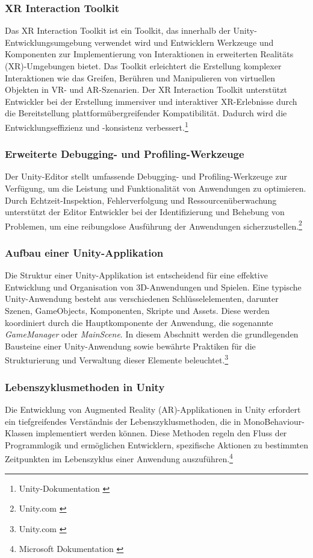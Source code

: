 \subsubsection*{XR Interaction Toolkit}
Das XR Interaction Toolkit ist ein Toolkit, das innerhalb der Unity-Entwicklungsumgebung verwendet wird und Entwicklern
Werkzeuge und Komponenten zur Implementierung von Interaktionen in erweiterten Realitäts (XR)-Umgebungen bietet. Das
Toolkit erleichtert die Erstellung komplexer Interaktionen wie das Greifen, Berühren und Manipulieren von virtuellen
Objekten in VR- und AR-Szenarien. Der XR Interaction Toolkit unterstützt Entwickler bei der Erstellung immersiver und
interaktiver XR-Erlebnisse durch die Bereitstellung plattformübergreifender Kompatibilität. Dadurch wird die Entwicklungseffizienz
und -konsistenz verbessert.\footnote{Unity-Dokumentation \cite{XR Interaction Toolkit}}

\subsubsection{Erweiterte Debugging- und Profiling-Werkzeuge}
Der Unity-Editor stellt umfassende Debugging- und Profiling-Werkzeuge zur Verfügung, um die Leistung und Funktionalität
von Anwendungen zu optimieren. Durch Echtzeit-Inspektion, Fehlerverfolgung und Ressourcenüberwachung unterstützt der
Editor Entwickler bei der Identifizierung und Behebung von Problemen, um eine reibungslose Ausführung der Anwendungen
sicherzustellen.\footnote{Unity.com \cite{Tools for profiling and debugging}}

\subsubsection{Aufbau einer Unity-Applikation}
Die Struktur einer Unity-Applikation ist entscheidend für eine effektive Entwicklung und Organisation von 3D-Anwendungen
und Spielen. Eine typische Unity-Anwendung besteht aus verschiedenen Schlüsselelementen, darunter Szenen, GameObjects,
Komponenten, Skripte und Assets. Diese werden koordiniert durch die Hauptkomponente der Anwendung, die sogenannte
\textit{GameManager} oder \textit{MainScene}. In diesem Abschnitt werden die grundlegenden Bausteine einer Unity-Anwendung sowie
bewährte Praktiken für die Strukturierung und Verwaltung dieser Elemente beleuchtet.\footnote{Unity.com \cite{Was ist mit Quellcodeverwaltung gemeint?}}

\subsubsection{\label{sec:Shrek is leben}Lebenszyklusmethoden in Unity}
Die Entwicklung von Augmented Reality (AR)-Applikationen in Unity erfordert ein tiefgreifendes Verständnis der
Lebenszyklusmethoden, die in MonoBehaviour-Klassen implementiert werden können. Diese Methoden regeln den Fluss der
Programmlogik und ermöglichen Entwicklern, spezifische Aktionen zu bestimmten Zeitpunkten im Lebenszyklus einer
Anwendung auszuführen.\footnote{Microsoft Dokumentation \cite{Subsysteme MRTK3}}

